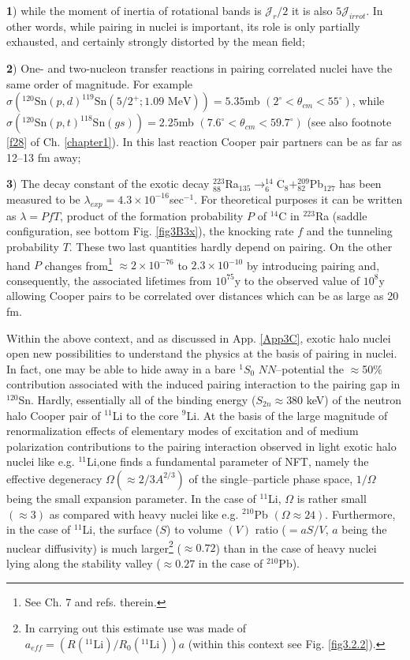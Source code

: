   \textbf{1}) while the moment of inertia of rotational bands is $\mathcal J_r/2$ it is also $5 \mathcal J_{irrot}$. In other words, while pairing in nuclei is important, its role is only partially exhausted, and certainly strongly distorted by the mean field; 
  
  \textbf{2}) One- and two-nucleon transfer reactions in pairing correlated nuclei have the same order of magnitude. For example $\sigma (^{120}\text{Sn}(p,d)^{119}\text{Sn}(5/2^+; 1.09 \text{ MeV}))=5.35 $mb $(2^\circ<\theta_{cm}<55^\circ)$, while $\sigma (^{120}\text{Sn}(p,t)^{118}\text{Sn}(gs))=2.25 $mb $(7.6^\circ<\theta_{cm}<59.7^\circ)$ (see also footnote \ref{f28} of  Ch. \ref{chapter1}). In this last reaction Cooper pair partners can be as far as 12--13 fm away;
  
   \textbf{3}) The decay constant of the exotic decay $^{223}_{88}$Ra$_{135}\rightarrow^{14}_6$C$_8+^{209}_{82}$Pb$_{127}$ has been measured to be $\lambda_{exp}=4.3\times10^{-16}$sec$^{-1}$. For theoretical purposes it can be written as $\lambda=PfT$, product of the formation probability $P$ of $^{14}$C in $^{223}$Ra (saddle configuration, see bottom Fig. \ref{fig3B3x}), the knocking rate $f$ and the tunneling probability $T$. These two last quantities hardly depend on pairing. On the other hand $P$ changes from\footnote{See \cite{Brink:05} Ch. 7 and refs. therein.} $\approx 2\times10^{-76}$ to $2.3\times10^{-10}$ by introducing pairing and, consequently, the associated lifetimes from $10^{75}$y to the observed value of $10^8$y  allowing Cooper pairs to be correlated over distances which can be as large as 20 fm.
 
 
 Within the above context, and as discussed in App. \ref{App3C}, exotic halo nuclei open new possibilities to understand the physics at the basis of pairing in nuclei. In fact, one may be able to hide away in a bare $^1S_0$ $NN$--potential the $\approx$50\% contribution associated with the induced pairing interaction to the pairing gap in $^{120}$Sn. Hardly, essentially all of the binding energy ($S_{2n}\approx380$ keV) of the neutron halo Cooper pair of $^{11}$Li to the core $^{9}$Li. At the basis of the large magnitude of renormalization effects of elementary modes of excitation and of medium polarization contributions to the pairing interaction observed in light exotic halo nuclei like e.g. $^{11}$Li,one finds a fundamental parameter of NFT, namely the effective degeneracy $\Omega(\approx2/3A^{2/3})$ of the single--particle phase space, $1/\Omega$ being the small expansion parameter. In the case of $^{11}$Li, $\Omega$ is rather small $(\approx3)$ as compared with heavy nuclei like e.g. $^{210}$Pb $(\Omega\approx24)$. Furthermore, in the case of $^{11}$Li, the surface ($S$) to volume $(V)$ ratio ($=aS/V$, $a$ being the nuclear diffusivity) is much larger\footnote{In carrying out this estimate use was made of $a_{eff}=\left(R(^{11}\text{Li})/R_0(^{11}\text{Li})\right)a$ (within this context see Fig. \ref{fig3.2.2}).} ($\approx0.72$) than in the case of heavy nuclei lying along the stability valley ($\approx0.27$ in the case of $^{210}$Pb).
